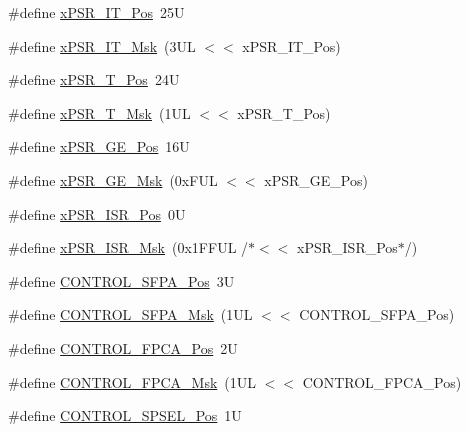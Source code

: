 \begin{DoxyCompactItemize}
\#define \mbox{\hyperlink{group___c_m_s_i_s___c_o_r_e_gac5be1db1343f776ecd00f0a4ebe70a46}{x\+P\+S\+R\+\_\+\+I\+T\+\_\+\+Pos}}~25U
\item 
\#define \mbox{\hyperlink{group___c_m_s_i_s___c_o_r_e_ga6dc177aab488851bb3b98cf4b420141a}{x\+P\+S\+R\+\_\+\+I\+T\+\_\+\+Msk}}~(3\+U\+L $<$$<$ x\+P\+S\+R\+\_\+\+I\+T\+\_\+\+Pos)
\item 
\#define \mbox{\hyperlink{group___c_m_s_i_s___c_o_r_e_ga98d801da9a49cda944f52aeae104dd38}{x\+P\+S\+R\+\_\+\+T\+\_\+\+Pos}}~24U
\item 
\#define \mbox{\hyperlink{group___c_m_s_i_s___c_o_r_e_ga30ae2111816e82d47636a8d4577eb6ee}{x\+P\+S\+R\+\_\+\+T\+\_\+\+Msk}}~(1\+U\+L $<$$<$ x\+P\+S\+R\+\_\+\+T\+\_\+\+Pos)
\item 
\#define \mbox{\hyperlink{group___c_m_s_i_s___c_o_r_e_gae2b0f3def0f378e9f1d10a4c727a064b}{x\+P\+S\+R\+\_\+\+G\+E\+\_\+\+Pos}}~16U
\item 
\#define \mbox{\hyperlink{group___c_m_s_i_s___c_o_r_e_ga967634e605d013e9b07002eca31f7903}{x\+P\+S\+R\+\_\+\+G\+E\+\_\+\+Msk}}~(0x\+F\+U\+L $<$$<$ x\+P\+S\+R\+\_\+\+G\+E\+\_\+\+Pos)
\item 
\#define \mbox{\hyperlink{group___c_m_s_i_s___c_o_r_e_ga21bff245fb1aef9683f693d9d7bb2233}{x\+P\+S\+R\+\_\+\+I\+S\+R\+\_\+\+Pos}}~0U
\item 
\#define \mbox{\hyperlink{group___c_m_s_i_s___c_o_r_e_gadf8eed87e0081dfe1ef1c78a0ea91afd}{x\+P\+S\+R\+\_\+\+I\+S\+R\+\_\+\+Msk}}~(0x1\+F\+F\+U\+L /$\ast$$<$$<$ x\+P\+S\+R\+\_\+\+I\+S\+R\+\_\+\+Pos$\ast$/)
\item 
\#define \mbox{\hyperlink{group___c_m_s_i_s___c_o_r_e_gac4eb493f7e00c0b286f6663b2554d5f1}{C\+O\+N\+T\+R\+O\+L\+\_\+\+S\+F\+P\+A\+\_\+\+Pos}}~3U
\item 
\#define \mbox{\hyperlink{group___c_m_s_i_s___c_o_r_e_gae1af7c6a3a6482a32ae290b66db3a3f8}{C\+O\+N\+T\+R\+O\+L\+\_\+\+S\+F\+P\+A\+\_\+\+Msk}}~(1\+U\+L $<$$<$ C\+O\+N\+T\+R\+O\+L\+\_\+\+S\+F\+P\+A\+\_\+\+Pos)
\item 
\#define \mbox{\hyperlink{group___c_m_s_i_s___c_o_r_e_gac7018b59b07134c5363b33eb94918a58}{C\+O\+N\+T\+R\+O\+L\+\_\+\+F\+P\+C\+A\+\_\+\+Pos}}~2U
\item 
\#define \mbox{\hyperlink{group___c_m_s_i_s___c_o_r_e_gad20bb0212b2e1864f24af38d93587c79}{C\+O\+N\+T\+R\+O\+L\+\_\+\+F\+P\+C\+A\+\_\+\+Msk}}~(1\+U\+L $<$$<$ C\+O\+N\+T\+R\+O\+L\+\_\+\+F\+P\+C\+A\+\_\+\+Pos)
\item 
\#define \mbox{\hyperlink{group___c_m_s_i_s___c_o_r_e_ga07eafc53e609895342c6a530e9d01310}{C\+O\+N\+T\+R\+O\+L\+\_\+\+S\+P\+S\+E\+L\+\_\+\+Pos}}~1U
$$
\end{DoxyCompactItemize}
